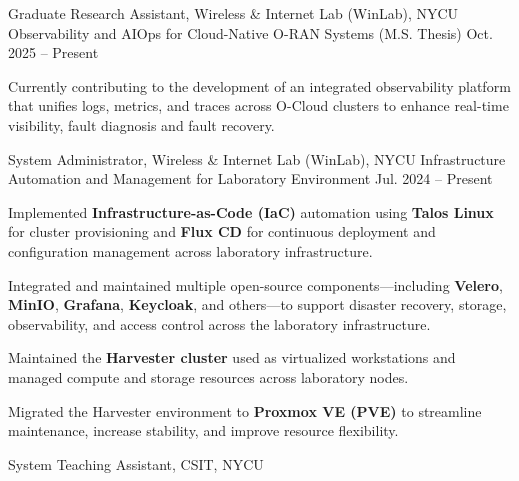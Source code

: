 
\begin{cventries}

    \cventry
    {Graduate Research Assistant, Wireless \& Internet Lab (WinLab), NYCU} %
    {Observability and AIOps for Cloud-Native O-RAN Systems (M.S. Thesis)} %
    {} %
    {Oct. 2025 -- Present} %
    {
      \begin{cvitems}
        \item {Currently contributing to the development of an integrated observability platform that unifies logs, metrics, and traces across O-Cloud clusters to enhance real-time visibility, fault diagnosis and fault recovery.} 
      \end{cvitems}
    }
  \cventry
  {System Administrator, Wireless \& Internet Lab (WinLab), NYCU} %
  {Infrastructure Automation and Management for Laboratory Environment} %
  {} %
  {Jul. 2024 -- Present} %
  {
    \begin{cvitems}
      \item {Implemented \textbf{Infrastructure-as-Code (IaC)} automation using \textbf{Talos Linux} for cluster provisioning and \textbf{Flux CD} for continuous deployment and configuration management across laboratory infrastructure.}
      \item {Integrated and maintained multiple open-source components—including \textbf{Velero}, \textbf{MinIO}, \textbf{Grafana}, \textbf{Keycloak}, and others—to support disaster recovery, storage, observability, and access control across the laboratory infrastructure.}
      \item {Maintained the \textbf{Harvester cluster} used as virtualized workstations and managed compute and storage resources across laboratory nodes.}
      \item {Migrated the Harvester environment to \textbf{Proxmox VE (PVE)} to streamline maintenance, increase stability, and improve resource flexibility.}
    \end{cvitems}
  }
  \cventry
  {System Teaching Assistant, CSIT, NYCU} %

\end{cventries}
